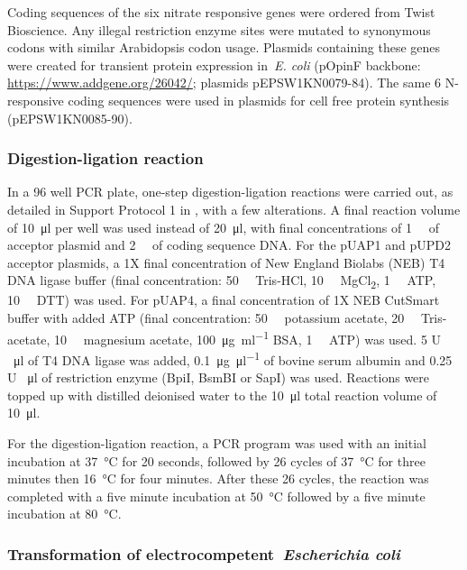 Coding sequences of the six nitrate responsive genes were ordered from
Twist Bioscience. Any illegal restriction enzyme sites were mutated to
synonymous codons with similar Arabidopsis codon usage. Plasmids
containing these genes were created for transient protein expression
in~\textit{E. coli} (pOpinF
backbone: \url{https://www.addgene.org/26042/}; plasmids
pEPSW1KN0079-84). The same 6 N\hyp{}responsive coding sequences were used in
plasmids for cell free protein synthesis (pEPSW1KN0085-90).

\subsubsection{Digestion-ligation reaction}\label{digestion-ligation-reaction}

In a 96 well PCR plate, one-step digestion-ligation reactions were carried out, as detailed in Support Protocol 1 in \textcite*{patronDNAAssemblyPlant2016}, with a few alterations.
A final reaction volume of \SI{10}{\micro\litre} per well was used instead of \SI{20}{\micro\litre}, with final concentrations of \SI{1}{\nano\Molar} of acceptor
plasmid and \SI{2}{\nano\Molar} of coding sequence DNA.
For the pUAP1 and pUPD2 acceptor plasmids, a 1X final concentration of New England Biolabs (NEB) T4 DNA ligase buffer (final concentration: \SI{50}{\milli\Molar} Tris-HCl, \SI{10}{\milli\Molar} MgCl\textsubscript{2}, \SI{1}{\milli\Molar} ATP, \SI{10}{\milli\Molar} DTT) was used.
For pUAP4, a final concentration of 1X NEB CutSmart buffer with added ATP (final concentration: \SI{50}{\milli\Molar} potassium acetate, \SI{20}{\milli\Molar} Tris-acetate, \SI{10}{\milli\Molar} magnesium acetate, \SI{100}{\micro\gram\per\ml} BSA, \SI{1}{\milli\Molar} ATP) was used.
5 U \si{\per\ul} of T4 DNA ligase was added, \SI{0.1}{\micro\gram\per\ul} of bovine serum albumin and 0.25 U \si{\per\micro\litre} of restriction enzyme (BpiI, BsmBI or SapI) was used. Reactions were topped up with distilled deionised water to the \SI{10}{\micro\litre} total reaction volume of \SI{10}{\micro\litre}.

For the digestion-ligation reaction, a PCR program was used with an initial incubation at \SI{37}{\degreeCelsius} for 20 seconds, followed by 26 cycles of \SI{37}{\degreeCelsius} for three minutes then \SI{16}{\degreeCelsius} for four minutes.
After these 26 cycles, the reaction was completed with a five minute incubation at \SI{50}{\degreeCelsius} followed by a five minute incubation at \SI{80}{\degreeCelsius}.

\subsubsection{Transformation of electrocompetent~\textit{Escherichia coli}}
\label{transformation-of-electrocompetent-escherichia-coli}

